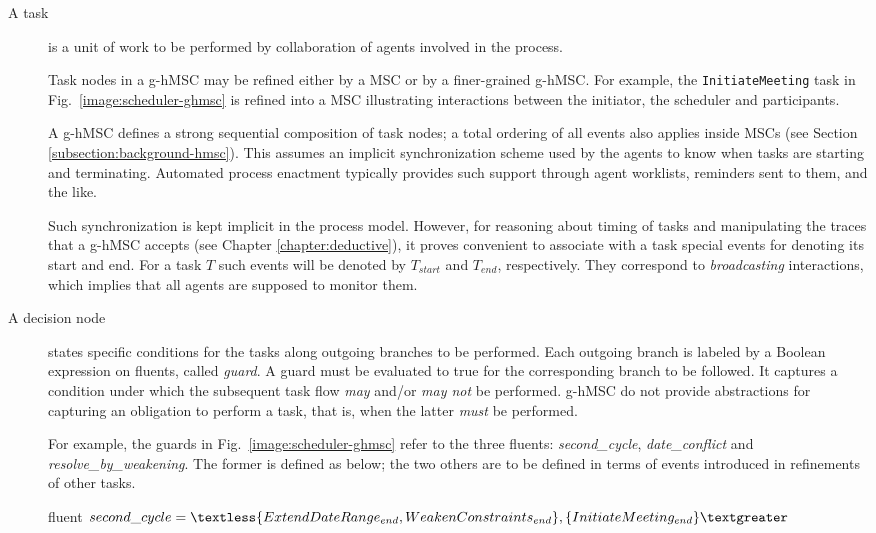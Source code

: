 \begin{description}
\item[A task] is a unit of work to be performed by collaboration of agents involved in the process. 

Task nodes in a g-hMSC may be refined either by a MSC or by a finer-grained g-hMSC. For example, the \texttt{InitiateMeeting} task in Fig.~\ref{image:scheduler-ghmsc} is refined into a MSC illustrating interactions between the initiator, the scheduler and participants. 

A g-hMSC defines a strong sequential composition of task nodes; a total ordering of all events also applies inside MSCs (see Section \ref{subsection:background-hmsc}). This assumes an implicit synchronization scheme used by the agents to know when tasks are starting and terminating. Automated process enactment typically provides such support through agent worklists, reminders sent to them, and the like. 

Such synchronization is kept implicit in the process model. However, for reasoning about timing of tasks and manipulating the traces that a g-hMSC accepts (see Chapter \ref{chapter:deductive}), it proves convenient to associate with a task special events for denoting its start and end. For a task $T$ such events will be denoted by $T_{start}$ and $T_{end}$, respectively. They correspond to \emph{broadcasting} interactions, which implies that all agents are supposed to monitor them.

\item[A decision node] states specific conditions for the tasks along outgoing branches to be performed. Each outgoing branch is labeled by a Boolean expression on fluents, called \emph{guard}. A guard must be evaluated to true for the corresponding branch to be followed. It captures a condition under which the subsequent task flow \emph{may} and/or \emph{may not} be performed. g-hMSC do not provide abstractions for capturing an obligation to perform a task, that is, when the latter \emph{must} be performed.

For example, the guards in Fig.~\ref{image:scheduler-ghmsc} refer to the three fluents: \emph{second\_cycle}, \emph{date\_conflict} and \emph{resolve\_by\_weakening}. The former is defined as below; the two others are to be defined in terms of events introduced in refinements of other tasks.
\begin{center}
fluent $second\_cycle = \newline \textless \{ ExtendDateRange_{end}, WeakenConstraints_{end} \}, \newline
 \{ InitiateMeeting_{end} \} \textgreater $\\
\end{center}


\end{description}
